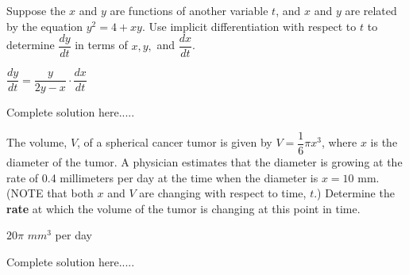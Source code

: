 \begin{example}
Suppose the $x$ and $y$ are functions of another variable $t$, and $x$ and $y$ are related by the equation $y^2=4+xy$. Use implicit differentiation with respect to $t$ to determine $\dfrac{dy}{dt}$ in terms of $x,y,$ and $\dfrac{dx}{dt}$.
    \begin{sol}
    $\dfrac{dy}{dt}=\dfrac{y}{2y-x}\cdot \dfrac{dx}{dt}$
    \end{sol}
    \begin{solL}
    Complete solution here.....
    
    \end{solL}
    
\end{example}


\newpage


\begin{example}
The volume, $V$, of a spherical cancer tumor is given by $V=\dfrac{1}{6}\pi x^3$, where $x$ is the diameter of the tumor.  A physician estimates that the diameter is growing at the rate of 0.4 millimeters per day at the time when the diameter is $x=10$ mm. (NOTE that both $x$ and $V$ are changing with respect to time, $t$.)  Determine the \textbf{rate} at which the volume of the tumor is changing at this point in time.
    \begin{sol}
    $20\pi$ $mm^3$ per day
    \end{sol}
    \begin{solL}
    Complete solution here.....
    
    \end{solL}
    
\end{example}

